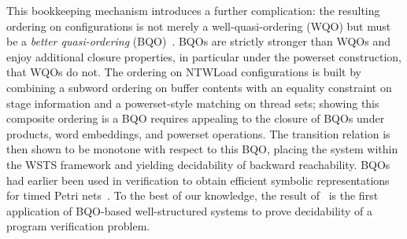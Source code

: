 This bookkeeping mechanism introduces a further complication: the resulting
ordering on configurations is not merely a well-quasi-ordering (WQO) but must
be a \emph{better quasi-ordering} (BQO)~\cite{Mar94}. BQOs are strictly
stronger than WQOs and enjoy additional closure properties, in particular
under the powerset construction, that WQOs do not. The ordering on NTWLoad
configurations is built by combining a subword ordering on buffer contents
with an equality constraint on stage information and a powerset-style matching
on thread sets; showing this composite ordering is a BQO requires appealing to
the closure of BQOs under products, word embeddings, and powerset operations.
The transition relation is then shown to be monotone with respect to this BQO,
placing the system within the WSTS framework and yielding decidability of
backward reachability. BQOs had earlier been used in verification to obtain
efficient symbolic representations for timed Petri nets~\cite{AN00,Abd10}. To
the best of our knowledge, the result of~\cite{AABKS26} is the first
application of BQO-based well-structured systems to prove decidability of a
program verification problem.
